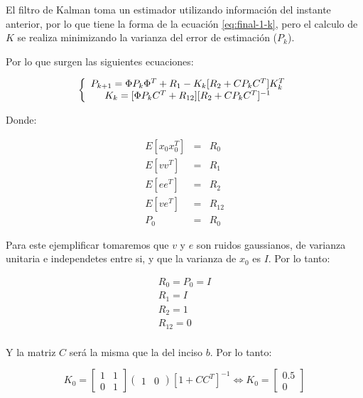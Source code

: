 El filtro de Kalman toma un estimador utilizando información del instante anterior, por lo que tiene la forma de la 
ecuación \ref{eq:final-1-k}, pero el calculo de $K$ se realiza minimizando la varianza del error de estimación ($P_k$).

Por lo que surgen las siguientes ecuaciones: 

\begin{equation}
    \left\{ \begin{array}{c} 
        P_{k+1} = \Phi P_k \Phi^T + R_1 - K_k[R_2 + CP_kC^T]K_k^T \\ 
        K_{k} = [\Phi P_k C^T + R_{12}][R_2 + CP_kC^T]^{-1}
     \end{array} \right.   
\end{equation}

Donde: 

\begin{equation}
    \begin{array}{ccc}
        E[x_0x_0^T] &=& R_0 \\
        E[vv^T] &=& R_1 \\
        E[ee^T] &=& R_2 \\
        E[ve^T] &=& R_{12} \\
        P_0 &=& R_0 
    \end{array}
\end{equation}

Para este ejemplificar tomaremos que $v$ y $e$ son ruidos gaussianos, de varianza unitaria e independetes entre si, y 
que la varianza de $x_0$ es $I$. Por lo tanto: 

\begin{equation}
    \begin{array}{c}
        R_0 = P_0 = I \\
        R_1 = I \\ 
        R_2 = 1 \\ 
        R_{12} = 0 \\
    \end{array}
\end{equation}

Y la matriz $C$ será la misma que la del inciso $b$. Por lo tanto: 

\begin{equation}
    K_0 = 
    \begin{bmatrix}
        1 & 1 \\
        0 & 1
    \end{bmatrix} \begin{pmatrix}
        1 & 0
    \end{pmatrix} [1 + CC^T]^{-1} \Leftrightarrow
    K_0 = \begin{bmatrix}
        0.5 \\ 0
    \end{bmatrix}
\end{equation}

